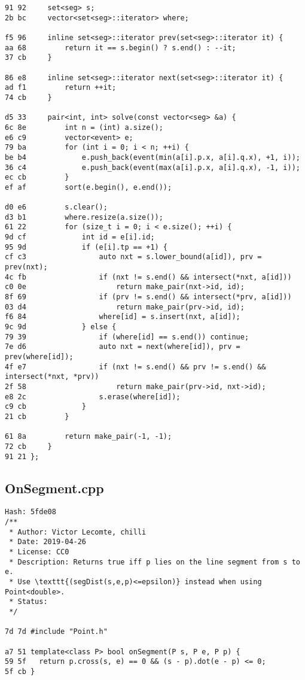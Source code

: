 \documentclass[11pt, a4paper, twoside]{article}
\begin{document}
\begin{lstlisting}
91 92     set<seg> s;
2b bc     vector<set<seg>::iterator> where;
       
f5 96     inline set<seg>::iterator prev(set<seg>::iterator it) {
aa 68         return it == s.begin() ? s.end() : --it;
37 cb     }
       
86 e8     inline set<seg>::iterator next(set<seg>::iterator it) {
ad f1         return ++it;
74 cb     }
       
d5 33     pair<int, int> solve(const vector<seg> &a) {
6c 8e         int n = (int) a.size();
e6 c9         vector<event> e;
79 ba         for (int i = 0; i < n; ++i) {
be b4             e.push_back(event(min(a[i].p.x, a[i].q.x), +1, i));
36 c4             e.push_back(event(max(a[i].p.x, a[i].q.x), -1, i));
ec cb         }
ef af         sort(e.begin(), e.end());
       
d0 e6         s.clear();
d3 b1         where.resize(a.size());
61 22         for (size_t i = 0; i < e.size(); ++i) {
9d cf             int id = e[i].id;
95 9d             if (e[i].tp == +1) {
cf c3                 auto nxt = s.lower_bound(a[id]), prv = prev(nxt);
4c fb                 if (nxt != s.end() && intersect(*nxt, a[id]))
c0 0e                     return make_pair(nxt->id, id);
8f 69                 if (prv != s.end() && intersect(*prv, a[id]))
03 d4                     return make_pair(prv->id, id);
f6 84                 where[id] = s.insert(nxt, a[id]);
9c 9d             } else {
79 39                 if (where[id] == s.end()) continue;
7e d6                 auto nxt = next(where[id]), prv = prev(where[id]);
4f e7                 if (nxt != s.end() && prv != s.end() && intersect(*nxt, *prv))
2f 58                     return make_pair(prv->id, nxt->id);
e8 2c                 s.erase(where[id]);
c9 cb             }
21 cb         }
       
61 8a         return make_pair(-1, -1);
72 cb     }
91 21 };
\end{lstlisting}

\subsection{OnSegment.cpp}
\begin{lstlisting}
Hash: 5fde08
/**
 * Author: Victor Lecomte, chilli
 * Date: 2019-04-26
 * License: CC0
 * Description: Returns true iff p lies on the line segment from s to e.
 * Use \texttt{(segDist(s,e,p)<=epsilon)} instead when using Point<double>.
 * Status:
 */

7d 7d #include "Point.h"

a7 51 template<class P> bool onSegment(P s, P e, P p) {
59 5f 	return p.cross(s, e) == 0 && (s - p).dot(e - p) <= 0;
5f cb }
\end{lstlisting}
\end{document}
